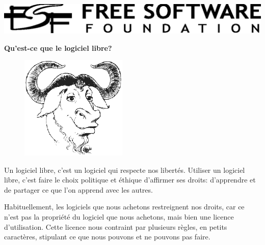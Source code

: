 \documentclass[twoside,12pt]{article}
\begin{document}
\begin{center}

\includegraphics{fsf-logo.eps}

\vspace{0.3in}

{\Huge\bf Qu'est-ce que le logiciel libre?}

\end{center}

\begin{figure}
 \begin{center}
   \includegraphics[width=2in]{gnu-head.eps}
 \end{center}
\end{figure}

Un logiciel libre, c'est un logiciel qui respecte nos libertés. Utiliser un
logiciel libre, c'est faire le choix politique et éthique d'affirmer ses
droits: d'apprendre et de partager ce que l'on apprend avec les autres.


Habituellement, les logiciels que nous achetons restreignent nos droits, car ce
n'est pas la propriété du logiciel que nous achetons, mais bien une licence
d'utilisation. Cette licence nous contraint par plusieurs règles, en petits
caractères, stipulant ce que nous pouvons et ne pouvons pas faire.

\end{document}
